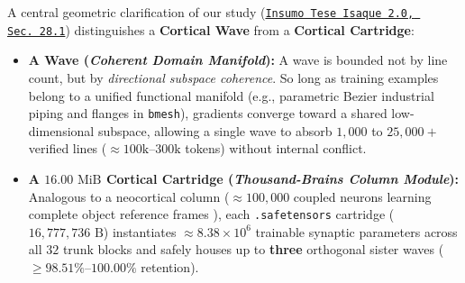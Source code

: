 \documentclass[10pt,a4paper]{article}
\begin{document}
A central geometric clarification of our study (\href{https://drive.google.com/file/d/1-i60d5UqJBOJQYLSr-ErZxecFeYSi4zX/view?usp=drivesdk}{\texttt{Insumo Tese Isaque 2.0, Sec.\ 28.1}}) distinguishes a \textbf{Cortical Wave} from a \textbf{Cortical Cartridge}:
\begin{itemize}
  \item \textbf{A Wave (\textit{Coherent Domain Manifold}):} A wave is bounded not by line count, but by \textit{directional subspace coherence}. So long as training examples belong to a unified functional manifold (e.g., parametric Bezier industrial piping and flanges in \texttt{bmesh}), gradients converge toward a shared low-dimensional subspace, allowing a single wave to absorb $1,000$ to $25,000+$ verified lines ($\approx 100\text{k}\text{--}300\text{k}$ tokens) without internal conflict.
  \item \textbf{A $16.00\text{ MiB}$ Cortical Cartridge (\textit{Thousand-Brains Column Module}):} Analogous to a neocortical column ($\approx 100,000$ coupled neurons learning complete object reference frames \cite{hawkins2019grid,clay2024monty}), each \texttt{.safetensors} cartridge ($16,777,736\text{ B}$) instantiates $\approx 8.38 \times 10^6$ trainable synaptic parameters across all $32$ trunk blocks and safely houses up to \textbf{three} orthogonal sister waves ($\ge 98.51\%\text{--}100.00\%$ retention).
\end{itemize}
\end{document}

